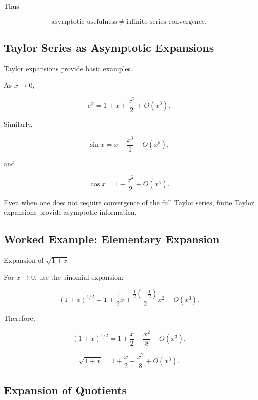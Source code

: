 Thus

\[
\boxed{
\text{asymptotic usefulness}
\neq
\text{infinite-series convergence}.
}
\]

\subsection{Taylor Series as Asymptotic Expansions}
\label{subsec:taylor-asymptotic-expansions}

Taylor expansions provide basic examples.

As \(x\to0\),

\[
e^x
=
1+x+\frac{x^2}{2}
+
O(x^3).
\]

Similarly,

\[
\sin x
=
x-\frac{x^3}{6}
+
O(x^5),
\]

and

\[
\cos x
=
1-\frac{x^2}{2}
+
O(x^4).
\]

Even when one does not require convergence of the full Taylor series,
finite Taylor expansions provide asymptotic information.

\subsection{Worked Example: Elementary Expansion}
\label{subsec:worked-elementary-asymptotic}

\begin{workedexamplebox}{Expansion of \(\sqrt{1+x}\)}

For \(x\to0\), use the binomial expansion:

\[
(1+x)^{1/2}
=
1+\frac12x
+
\frac{\frac12(-\frac12)}{2}x^2
+
O(x^3).
\]

Therefore,

\[
(1+x)^{1/2}
=
1+\frac{x}{2}
-\frac{x^2}{8}
+
O(x^3).
\]

\begin{answerbox}
\[
\boxed{
\sqrt{1+x}
=
1+\frac{x}{2}
-\frac{x^2}{8}
+
O(x^3).
}
\]
\end{answerbox}

\end{workedexamplebox}

\subsection{Expansion of Quotients}
\label{subsec:asymptotic-quotients}

